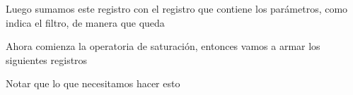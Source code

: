 
Luego sumamos este registro con el registro que contiene los parámetros, como indica el filtro, de manera que queda


Ahora comienza la operatoria de saturación, entonces vamos a armar los siguientes registros




Notar que lo que necesitamos hacer esto






